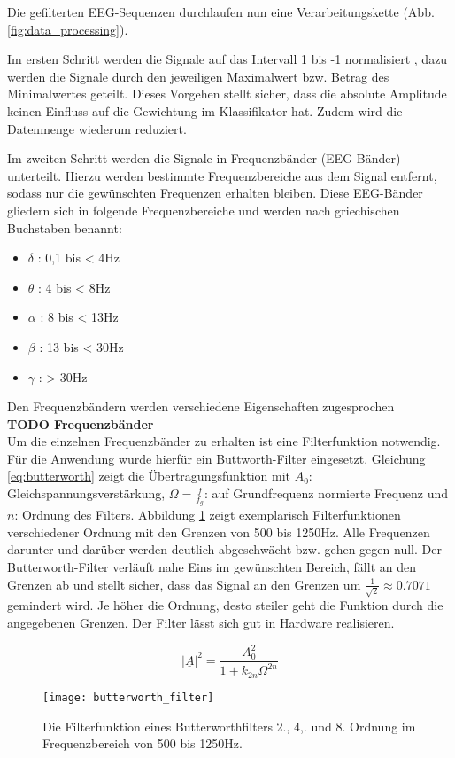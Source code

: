 \label{sec:processing}
Die gefilterten EEG-Sequenzen durchlaufen nun eine Verarbeitungskette (Abb. \ref{fig:data_processing}). 

Im ersten Schritt werden die Signale auf das Intervall 1 bis -1 normalisiert , dazu werden die Signale durch den jeweiligen Maximalwert bzw. Betrag des Minimalwertes geteilt. Dieses Vorgehen stellt sicher, dass die absolute Amplitude keinen Einfluss auf die Gewichtung im Klassifikator hat. Zudem wird die Datenmenge wiederum reduziert.

Im zweiten Schritt werden die Signale in Frequenzbänder (EEG-Bänder)  unterteilt. Hierzu werden bestimmte Frequenzbereiche aus dem Signal entfernt, sodass nur die gewünschten Frequenzen erhalten bleiben. Diese EEG-Bänder gliedern sich in folgende Frequenzbereiche und werden nach griechischen Buchstaben benannt:
\begin{itemize}
 \item $\delta$ : 0,1 bis < 4Hz
 \item $\theta$ :   4 bis < 8Hz
 \item $\alpha$ :   8 bis < 13Hz
 \item $\beta$  :  13 bis < 30Hz
 \item $\gamma$ :  > 30Hz
\end{itemize}
Den Frequenzbändern werden verschiedene Eigenschaften zugesprochen\\

\textbf{TODO Frequenzbänder}\\

Um die einzelnen Frequenzbänder zu erhalten ist eine Filterfunktion notwendig. Für die Anwendung wurde hierfür ein Buttworth-Filter\cite{Butterworth30} eingesetzt. Gleichung \ref{eq:butterworth} zeigt die Übertragungsfunktion mit $A_0$: Gleichspannungsverstärkung, $\Omega = \frac{f}{f_g}$: auf Grundfrequenz normierte Frequenz und $n$: Ordnung des Filters. Abbildung \ref{fig:butterworth_filter} zeigt exemplarisch Filterfunktionen verschiedener Ordnung mit den Grenzen von 500 bis 1250Hz. Alle Frequenzen darunter und darüber werden deutlich abgeschwächt bzw. gehen gegen null. Der Butterworth-Filter verläuft nahe Eins im gewünschten Bereich, fällt an den Grenzen ab und stellt sicher, dass das Signal an den Grenzen um $\frac{1}{\sqrt{2}} \approx 0.7071$ gemindert wird. Je höher die Ordnung, desto steiler geht die Funktion durch die angegebenen Grenzen. Der Filter lässt sich gut in Hardware realisieren.

\begin{equation} \label{eq:butterworth}
\left|\underline{A}\right|^2 = \frac{A_0^2}{1+ k_{2n} \Omega ^{2n}}
\end{equation}

\begin{figure}[h] 
  \begin{center}
    \texttt{[image: butterworth\_filter]}
    \caption[Butterworth-Filter]{Die Filterfunktion eines Butterworthfilters 2., 4,. und 8. Ordnung im Frequenzbereich von 500 bis 1250Hz. \label{fig:butterworth_filter}}
  \end{center}
\end{figure}